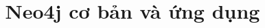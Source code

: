 %
%
%
% 
%
\title{Neo4j cơ bản và ứng dụng}

\documentclass[12pt]{article}
\usepackage[T5]{fontenc}
\usepackage[utf8]{inputenc}
\usepackage[vietnamese,english]{babel}
\usepackage{amsmath}
\usepackage{graphicx}
\usepackage[colorinlistoftodos]{todonotes}
\usepackage{listings}
\usepackage{hyperref}
\hypersetup{
    colorlinks=true,
    linkcolor=blue,
    filecolor=magenta,      
    urlcolor=cyan,
}




